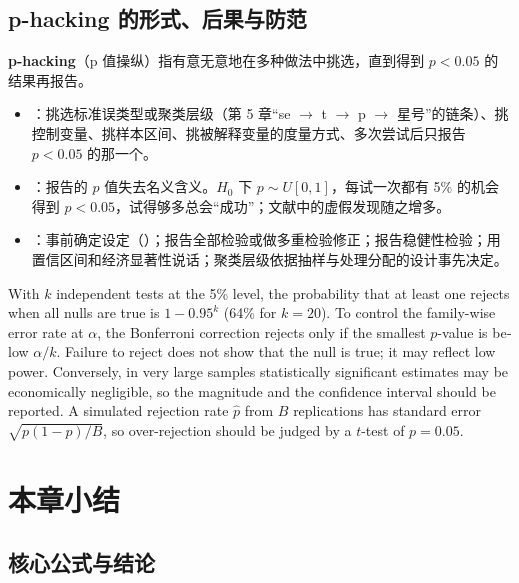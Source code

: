 \subsection{p-hacking 的形式、后果与防范}

\textbf{p-hacking}（p 值操纵）指有意无意地在多种做法中挑选，直到得到 $p<0.05$ 的结果再报告。
\begin{itemize}
  \item {}：挑选标准误类型或聚类层级（第 5 章“se $\to$ t $\to$ p $\to$ 星号”的链条）、挑控制变量、挑样本区间、挑被解释变量的度量方式、多次尝试后只报告 $p<0.05$ 的那一个。
  \item {}：报告的 $p$ 值失去名义含义。$H_0$ 下 $p\sim U[0,1]$，每试一次都有 5\% 的机会得到 $p<0.05$，试得够多总会“成功”；文献中的虚假发现随之增多。
  \item {}：事前确定设定（）；报告全部检验或做多重检验修正；报告稳健性检验；用置信区间和经济显著性说话；聚类层级依据抽样与处理分配的设计事先决定。
\end{itemize}

\begin{english}
With $k$ independent tests at the 5\% level, the probability that at least one rejects when all nulls are true is $1-0.95^k$ (64\% for $k=20$). To control the family-wise error rate at $\alpha$, the Bonferroni correction rejects only if the smallest $p$-value is below $\alpha/k$. Failure to reject does not show that the null is true; it may reflect low power. Conversely, in very large samples statistically significant estimates may be economically negligible, so the magnitude and the confidence interval should be reported. A simulated rejection rate $\hat p$ from $B$ replications has standard error $\sqrt{p(1-p)/B}$, so over-rejection should be judged by a $t$-test of $p=0.05$.
\end{english}

\section{本章小结}\label{sec:U06b-summary}

\subsection{核心公式与结论}

